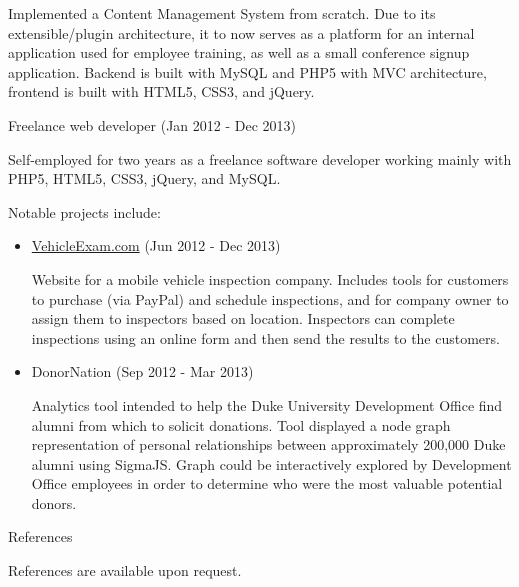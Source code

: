 \documentclass{article}
\begin{document}
    Implemented a Content Management System from scratch. Due to its extensible/plugin architecture, it to now serves as a platform for an internal application used for employee training, as well as a small conference signup application. Backend is built with MySQL and PHP5 with MVC architecture, frontend is built with HTML5, CSS3, and jQuery.


    \bigskip\bigskip

    {
        \large
        Freelance web developer 
        {
            \color{fade-gray}
            \small
            (Jan 2012 - Dec 2013)
        }
    }

    \medskip

    Self-employed for two years as a freelance software developer working mainly with PHP5, HTML5, CSS3, jQuery, and MySQL. 
    
    \smallskip

    Notable projects include:

    \begin{itemize}
        \item \href{http://vehicleexam.com}{VehicleExam.com}
        {
            \color{fade-gray}
            \small
            (Jun 2012 - Dec 2013)
        }

        Website for a mobile vehicle inspection company. Includes tools for customers to purchase (via PayPal) and schedule inspections, and for company owner to assign them to inspectors based on location. Inspectors can complete inspections using an online form and then send the results to the customers.

        \item DonorNation
        {
            \color{fade-gray}
            \small
            (Sep 2012 - Mar 2013)
        }

        Analytics tool intended to help the Duke University Development Office find alumni from which to solicit donations. Tool displayed a node graph representation of personal relationships between approximately 200,000 Duke alumni using SigmaJS. Graph could be interactively explored by Development Office employees in order to determine who were the most valuable potential donors.

    \end{itemize}



    \bigskip\bigskip\bigskip

    {
        \noindent\Large
        References
    }

    \noindent\makebox[\linewidth]{\rule{\textwidth}{0.4pt}}
    \medskip

    References are available upon request.
        
\end{document}

